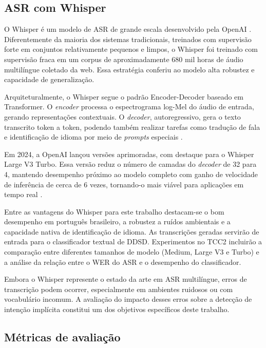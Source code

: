 \documentclass[
    12pt,                %
    openright,           %
    oneside,             %
    a4paper,             %
    english,             %
    brazil               %
]{abntex2}
\begin{document}

\subsection{ASR com Whisper}

O Whisper é um modelo de ASR de grande escala desenvolvido pela OpenAI \cite{Radford2023}. Diferentemente da maioria dos sistemas tradicionais, treinados com supervisão forte em conjuntos relativamente pequenos e limpos, o Whisper foi treinado com supervisão fraca em um corpus de aproximadamente 680 mil horas de áudio multilíngue coletado da web. Essa estratégia conferiu ao modelo alta robustez e capacidade de generalização.

Arquiteturalmente, o Whisper segue o padrão Encoder-Decoder baseado em Transformer. O \textit{encoder} processa o espectrograma log-Mel do áudio de entrada, gerando representações contextuais. O \textit{decoder}, autoregressivo, gera o texto transcrito token a token, podendo também realizar tarefas como tradução de fala e identificação de idioma por meio de \textit{prompts} especiais \cite{Radford2023}.

Em 2024, a OpenAI lançou versões aprimoradas, com destaque para o Whisper Large V3 Turbo. Essa versão reduz o número de camadas do \textit{decoder} de 32 para 4, mantendo desempenho próximo ao modelo completo com ganho de velocidade de inferência de cerca de 6 vezes, tornando-o mais viável para aplicações em tempo real \cite{Jeffries2024, Bevilacqua2024}.

Entre as vantagens do Whisper para este trabalho destacam-se o bom desempenho em português brasileiro, a robustez a ruídos ambientais e a capacidade nativa de identificação de idioma. As transcrições geradas servirão de entrada para o classificador textual de DDSD. Experimentos no TCC2 incluirão a comparação entre diferentes tamanhos de modelo (Medium, Large V3 e Turbo) e a análise da relação entre o WER do ASR e o desempenho do classificador.

Embora o Whisper represente o estado da arte em ASR multilíngue, erros de transcrição podem ocorrer, especialmente em ambientes ruidosos ou com vocabulário incomum. A avaliação do impacto desses erros sobre a detecção de intenção implícita constitui um dos objetivos específicos deste trabalho.


\subsection{Métricas de avaliação}
\label{sec:metricas}
\end{document}
